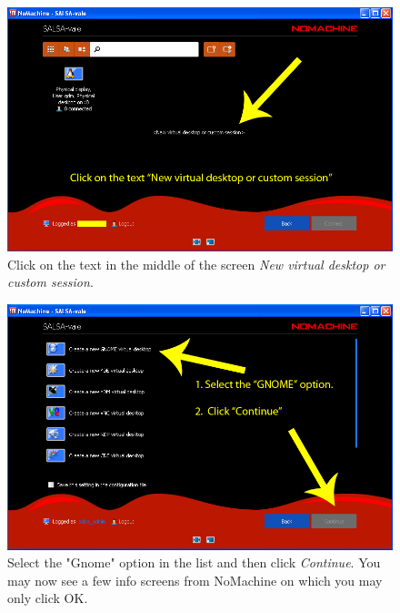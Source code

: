 \begin{figure}[H]
    \centering
    \includegraphics[height=0.25\paperheight]{../figures/nomachinefigs/fig7_session.png}
    \caption{Click on the text in the middle of the screen \emph{New virtual desktop or custom session}. }
    \label{fig:session}
\end{figure}

\begin{figure}[H]
    \centering
    \includegraphics[height=0.25\paperheight]{../figures/nomachinefigs/fig8_gnome.png}
    \caption{Select the "Gnome" option in the list and then click \emph{Continue}. You may now
see a few info screens from NoMachine on which you may only click OK.}
    \label{fig:gnome}
\end{figure}

